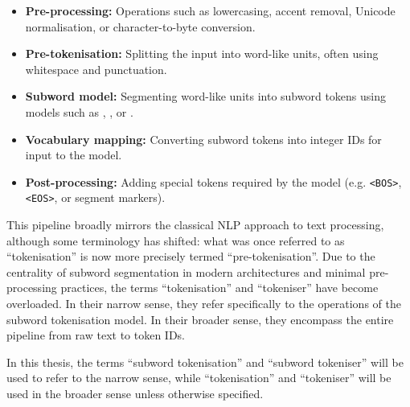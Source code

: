 \begin{itemize}
\item \textbf{Pre-processing:} Operations such as lowercasing, accent removal, Unicode normalisation, or character-to-byte conversion.
\item \textbf{Pre-tokenisation:} Splitting the input into word-like units, often using whitespace and punctuation.
\item \textbf{Subword model:} Segmenting word-like units into subword tokens using models such as \bpe, \wordpiecefull, or \unigram.
\item \textbf{Vocabulary mapping:} Converting subword tokens into integer IDs for input to the model.
\item \textbf{Post-processing:} Adding special tokens required by the model (e.g. \texttt{<BOS>}, \texttt{<EOS>}, or segment markers).
\end{itemize}

This pipeline broadly mirrors the classical NLP approach to text processing, although some terminology has shifted: what was once referred to as ``tokenisation'' is now more precisely termed ``pre-tokenisation''. Due to the centrality of subword segmentation in modern architectures and minimal pre-processing practices, the terms ``tokenisation'' and ``tokeniser'' have become overloaded. In their narrow sense, they refer specifically to the operations of the subword tokenisation model. In their broader sense, they encompass the entire pipeline from raw text to token IDs.

In this thesis, the terms ``subword tokenisation'' and ``subword tokeniser'' will be used to refer to the narrow sense, while ``tokenisation'' and ``tokeniser'' will be used in the broader sense unless otherwise specified.


